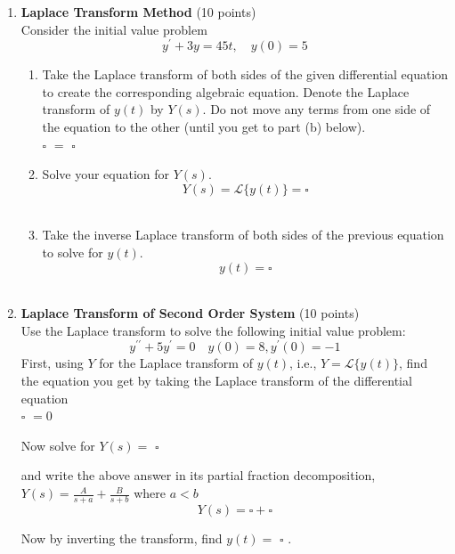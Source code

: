 \begin{enumerate}
  \item \textbf{Laplace Transform Method} (10 points)\\
  Consider the initial value problem
  $$
  y^{\prime}+3 y=45 t, \quad y(0)=5
  $$
  \begin{enumerate}[label=\alph*]
    \item Take the Laplace transform of both sides of the given differential equation to create the corresponding algebraic equation. Denote the Laplace transform of $y(t)$ by $Y(s)$. Do not move any terms from one side of the equation to the other (until you get to part (b) below).\\
    $\square$ $=$ $\square$\\
    \begin{subanswer}
    \end{subanswer}
    \item Solve your equation for $Y(s)$.\\
    $$
    Y(s)=\mathcal{L}\{y(t)\}=\square
    $$\\
    \begin{subanswer}
    \end{subanswer}
    \item Take the inverse Laplace transform of both sides of the previous equation to solve for $y(t)$.\\
    $$
    y(t)=\square
    $$\\
    \begin{subanswer}
    \end{subanswer}
  \end{enumerate}

  \item \textbf{Laplace Transform of Second Order System} (10 points)\\
  Use the Laplace transform to solve the following initial value problem:
  $$
  y^{\prime \prime}+5 y^{\prime}=0 \quad y(0)=8, y^{\prime}(0)=-1
  $$
  First, using $Y$ for the Laplace transform of $y(t)$, i.e., $Y=\mathcal{L}\{y(t)\}$, find the equation you get by taking the Laplace transform of the differential equation\\
  $\square$ $=0$\\
  \begin{subanswer}
  \end{subanswer}
  Now solve for $Y(s)=$ $\square$\\
  \begin{subanswer}
  \end{subanswer}
  and write the above answer in its partial fraction decomposition, $Y(s)=\frac{A}{s+a}+\frac{B}{s+b}$ where $a<b$\\
  $$
  Y(s)=\square+\square
  $$
  \begin{subanswer}
  \end{subanswer}
  Now by inverting the transform, find $y(t)=$ $\square$ .\\
  \begin{subanswer}
  \end{subanswer}


\end{enumerate}
